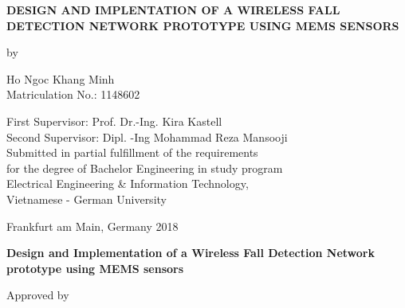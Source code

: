 \begin{titlepage}
\begin{center}
        \vspace*{2.3cm}
        \Large
        {\bf DESIGN AND IMPLENTATION OF A WIRELESS FALL DETECTION NETWORK PROTOTYPE USING MEMS SENSORS}

        \vspace*{0.5cm}

        \normalsize
        by \\

        \vspace*{0.5cm}

        \Large
        Ho Ngoc Khang Minh \\
      	\normalsize
      	\vspace{0.2cm}
		Matriculation No.: 1148602
		
        \vspace*{1.5cm}
        \large
       	First Supervisor: Prof. Dr.-Ing. Kira Kastell \\
       	Second Supervisor: Dipl. -Ing Mohammad Reza Mansooji \\
       	\vspace{1.7cm}
        \normalsize
        Submitted in partial fulfillment of the requirements\\
        for the degree of Bachelor Engineering in study program\\
        Electrical Engineering \& Information Technology,\\
        Vietnamese - German University

        \vspace*{3.0cm}
		
        Frankfurt am Main, Germany 2018 \\
	
        
        \end{center}
\end{titlepage}

\pagestyle{plain}
\setcounter{page}{2}
\cleardoublepage
\begin{center}
\LARGE
{\bf Design and Implementation of a Wireless Fall Detection Network prototype using MEMS sensors}
\end{center}
\vspace{3cm}
\hspace{7.5cm}
Approved by\\

\vspace{2cm}

